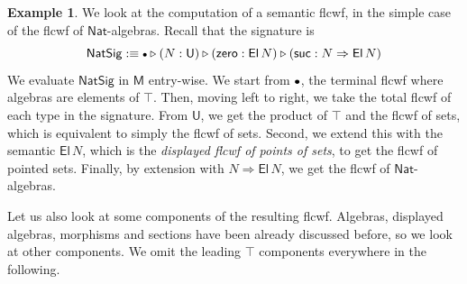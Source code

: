\documentclass[12pt,a4paper,twoside,openany]{book}
\theoremstyle{remark}
\theoremstyle{definition}
\newtheorem{myexample}{Example}
\theoremstyle{theorem}
\newcommand{\ms}[1]{\mathsf{#1}}
\newcommand{\bs}[1]{\boldsymbol{#1}}
\newcommand{\zero}{\ms{zero}}
\newcommand{\suc}{\ms{suc}}
\newcommand{\U}{\mathsf{U}}
\newcommand{\El}{\mathsf{El}}
\newcommand{\ext}{\triangleright}
\newcommand{\emptycon}{\scaleobj{.75}\bullet}
\newcommand{\funi}{\Rightarrow}
\newcommand{\bemptycon}{\scaleobj{.75}{\bs{\bullet}}}
\newcommand{\bM}{\bs{\mathsf{M}}}
\newcommand{\Nat}{\ms{Nat}}
\newcommand{\defn}{:\equiv}
\begin{document}
\begin{myexample}
We look at the computation of a semantic flcwf, in the simple case of the flcwf
of $\Nat$-algebras. Recall that the signature is
\[
  \ms{NatSig} \defn \emptycon \ext (N : \U) \ext (\zero : \El\,N) \ext (\suc : N \funi \El\,N)
\]
We evaluate $\ms{NatSig}$ in $\bM$ entry-wise. We start from $\bemptycon$, the
terminal flcwf where algebras are elements of $\top$. Then, moving left to
right, we take the total flcwf of each type in the signature. From $\U$, we get
the product of $\top$ and the flcwf of sets, which is equivalent to simply the
flcwf of sets. Second, we extend this with the semantic $\El\,N$, which is the
\emph{displayed flcwf of points of sets}, to get the flcwf of pointed
sets. Finally, by extension with $N \funi \El\,N$, we get the flcwf of
$\Nat$-algebras.

Let us also look at some components of the resulting flcwf. Algebras, displayed
algebras, morphisms and sections have been already discussed before, so we look
at other components. We omit the leading $\top$ components everywhere in the following.


\end{myexample}
\end{document}
